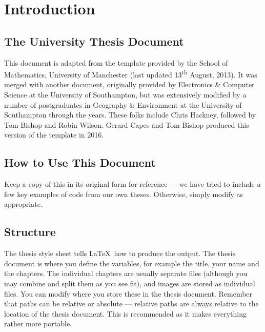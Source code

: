 \chapter{Introduction}
\section{The University Thesis Document}
This document is adapted from the template provided by the School of Mathematics, University of Manchester (last updated 13\textsuperscript{th} August, 2013). It was merged with another document, originally provided by Electronics \& Computer Science at the University of Southampton, but was extensively modified by a number of postgraduates in Geography \& Environment at the University of Southampton through the years. These folks include Chris Hackney, followed by Tom Bishop and Robin Wilson. Gerard Capes and Tom Bishop produced this version of the template in 2016.

\section{How to Use This Document}
Keep a copy of this in its original form for reference --- we have tried to include a few key examples of code from our own theses. Otherwise, simply modify as appropriate.

\section{Structure}
The thesis style sheet tells \LaTeX \ how to produce the output. The thesis document is where you define the variables, for example the title, your name and the chapters. The individual chapters are usually separate files (although you may combine and split them as you see fit), and images are stored as individual files. You can modify where you store these in the thesis document. Remember that paths can be relative or absolute --- relative paths are always relative to the location of the thesis document. This is recommended as it makes everything rather more portable.